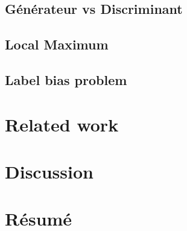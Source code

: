 \documentclass[a4paper]{article}
\begin{document}
\subsection{Générateur vs Discriminant}

\subsection{Local Maximum}

\subsection{Label bias problem}

\section{Related work}


\section{Discussion}
\section{Résumé}
\cite{greenwade93}




\end{document}
